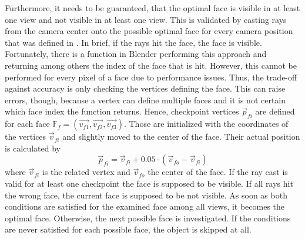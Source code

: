 Furthermore, it needs to be guaranteed, that the optimal face is visible in at least one view and not visible in at least one view.
This is validated by casting rays from the camera center onto the possible optimal face for every camera position that was defined in .
In brief, if the rays hit the face, the face is visible.
Fortunately, there is a function in Blender performing this approach and returning among others the index of the face that is hit.
However, this cannot be performed for every pixel of a face due to performance issues.
Thus, the trade-off against accuracy is only checking the vertices defining the face.
This can raise errors, though, because a vertex can define multiple faces and it is not certain which face index the function returns.
Hence, checkpoint vertices $\vec{p}_{fi}$ are defined for each face $\mathbb{F}_f = (\vec{v_{f1}}, \vec{v_{f2}}, \vec{v_{f3}})$.
Those are initialized with the coordinates of the vertices $\vec{v}_{fi}$ and slightly moved to the center of the face.
Their actual position is calculated by 
\begin{equation}
	\vec{p}_{fi} = \vec{v}_{fi} + 0.05 \cdot (\vec{v}_{fo} - \vec{v}_{fi})
\end{equation}
where $\vec{v}_{fi}$ is the related vertex and $\vec{v}_{fo}$ the center of the face.
If the ray cast is valid for at least one checkpoint the face is supposed to be visible.
If all rays hit the wrong face, the current face is supposed to be not visible.
As soon as both conditions are satisfied for the examined face among all views, it becomes the optimal face.
Otherwise, the next possible face is investigated.
If the conditions are never satisfied for each possible face, the object is skipped at all.

